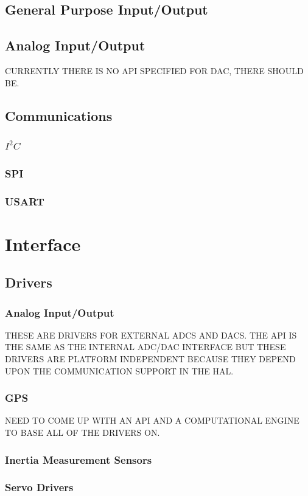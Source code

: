 \documentclass[10pt,letterpaper]{memoir} %
\newcommand{\iic}[0]{$I^{2}C$}
\begin{document}
\subsection{General Purpose Input/Output}
\subsection{Analog Input/Output}
CURRENTLY THERE IS NO API SPECIFIED FOR DAC, THERE SHOULD BE.

\subsection{Communications}
\subsubsection{\iic}
\subsubsection{SPI}
\subsubsection{USART}

\section{Interface}
\subsection{Drivers}
\subsubsection{Analog Input/Output}
THESE ARE DRIVERS FOR EXTERNAL ADCS AND DACS.  THE API IS THE SAME AS THE INTERNAL ADC/DAC INTERFACE BUT THESE DRIVERS ARE PLATFORM INDEPENDENT BECAUSE THEY DEPEND UPON THE COMMUNICATION SUPPORT IN THE HAL.
\subsubsection{GPS}
NEED TO COME UP WITH AN API AND A COMPUTATIONAL ENGINE TO BASE ALL OF THE DRIVERS ON.
\subsubsection{Inertia Measurement Sensors}
\subsubsection{Servo Drivers}
\end{document}

